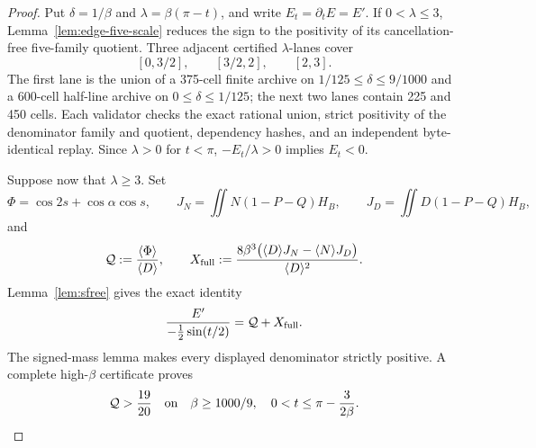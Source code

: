 \documentclass[11pt]{article}
\theoremstyle{remark}
\begin{document}
\begin{proof}
Put $\delta=1/\beta$ and $\lambda=\beta(\pi-t)$, and write
$E_t=\partial_tE=E'$.  If
$0<\lambda\le3$, Lemma~\ref{lem:edge-five-scale} reduces the sign to
the positivity of its cancellation-free five-family quotient.  Three
adjacent certified $\lambda$-lanes cover
\[
 [0,3/2],\qquad [3/2,2],\qquad [2,3].
\]
The first lane is the union of a 375-cell finite archive on
$1/125\le\delta\le9/1000$ and a 600-cell half-line archive on
$0\le\delta\le1/125$; the next two lanes contain 225 and 450 cells.
Each validator checks the exact rational union, strict positivity of
the denominator family and quotient, dependency hashes, and an
independent byte-identical replay.  Since $\lambda>0$ for $t<\pi$,
$-E_t/\lambda>0$ implies $E_t<0$.

Suppose now that $\lambda\ge3$.  Set
\[
 \Phi=\cos 2s+\cos\alpha\cos s,\qquad
 J_N=\iint N(1-P-Q)H_B,\qquad
 J_D=\iint D(1-P-Q)H_B,
\]
and
\[
 {\cal Q}:=\frac{\langle\Phi\rangle}{\langle D\rangle},
 \qquad
 X_{\rm full}:=
 \frac{8\beta^3\bigl(\langle D\rangle J_N
 -\langle N\rangle J_D\bigr)}{\langle D\rangle^2}.
\]
Lemma~\ref{lem:sfree} gives the exact identity
\begin{equation}\label{eq:terminal-highbeta}
 \frac{E'}{-\tfrac12\sin(t/2)}={\cal Q}+X_{\rm full}.
\end{equation}
The signed-mass lemma makes every displayed denominator strictly
positive.  A complete high-$\beta$ certificate proves
\[
 {\cal Q}>\frac{19}{20}
 \quad\text{on}\quad
 \beta\ge1000/9,\quad
 0<t\le\pi-\frac{3}{2\beta}.
\]


\end{proof}
\end{document}
